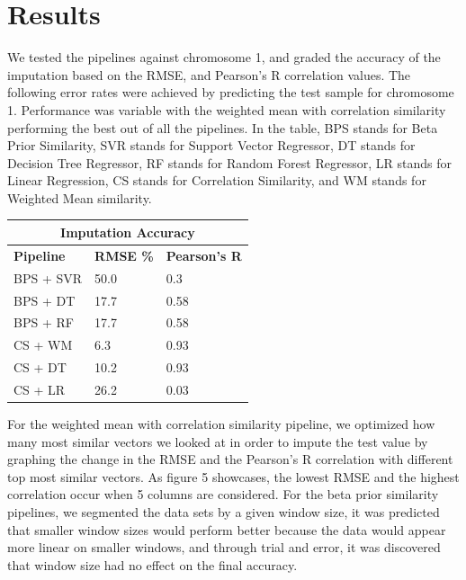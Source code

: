\documentclass{article} %
\begin{document}
\section{Results}
We tested the pipelines against chromosome 1, and graded the accuracy of the imputation based on the RMSE, and Pearson's R correlation values. The following error rates were achieved by predicting the test sample for chromosome 1. Performance was variable with the weighted mean with correlation similarity performing the best out of all the pipelines. In the table, BPS stands for Beta Prior Similarity, SVR stands for Support Vector Regressor, DT stands for Decision Tree Regressor, RF stands for Random Forest Regressor, LR stands for Linear Regression, CS stands for Correlation Similarity, and WM stands for Weighted Mean similarity.
\begin{center}
	\begin{tabular}{ |p{2cm}|p{2.3cm}|p{2.3cm}|}
		\hline
		\multicolumn{3}{|c|}{\textbf{Imputation Accuracy}} \\
		\hline
		\textbf{Pipeline} & \textbf{RMSE \%} & \textbf{Pearson's R} \\
		\hline
		BPS + SVR & 50.0 & 0.3 \\
		BPS + DT & 17.7  & 0.58 \\
		BPS + RF & 17.7 & 0.58 \\
		CS + WM & 6.3 & 0.93 \\
		CS + DT & 10.2 & 0.93 \\
		CS + LR & 26.2 & 0.03 \\
		\hline
	\end{tabular}
\end{center}

For the weighted mean with correlation similarity pipeline, we optimized how many most similar vectors we looked at in order to impute the test value by graphing the change in the RMSE and the Pearson's R correlation with different top most similar vectors. As figure 5 showcases, the lowest RMSE and the highest correlation occur when 5 columns are considered. For the beta prior similarity pipelines, we segmented the data sets by a given window size, it was predicted that smaller window sizes would perform better because the data would appear more linear on smaller windows, and through trial and error, it was discovered that window size had no effect on the final accuracy.
\end{document}

